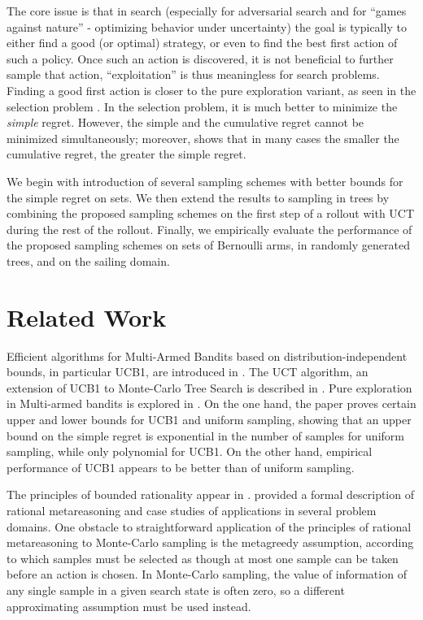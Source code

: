 \documentclass[letterpaper]{article}
\begin{document}
The core issue is that in search (especially for adversarial search
and for ``games against nature'' - optimizing behavior under
uncertainty) the goal is typically to either find a good (or optimal)
strategy, or even to find the best first action of such a policy. Once
such an action is discovered, it is not beneficial to further sample
that action, ``exploitation'' is thus meaningless for search
problems. Finding a good first action is closer to the pure
exploration variant, as seen in the selection problem
\cite{Bubeck.pure,TolpinShimony.blinkered}. In the selection problem,
it is much better to minimize the \emph{simple} regret.  However, the
simple and the cumulative regret cannot be minimized simultaneously;
moreover, \cite{Bubeck.pure} shows that in many cases the smaller the
cumulative regret, the greater the simple regret.

We begin with introduction of several sampling schemes with better
bounds for the simple regret on sets. We then extend the results to
sampling in trees by combining the proposed sampling schemes on the
first step of a rollout with UCT during the rest of the
rollout. Finally, we empirically evaluate the performance of the
proposed sampling schemes on sets of Bernoulli arms, in randomly
generated trees, and on the sailing domain.

\section{Related Work}
\label{sec:related-work}

Efficient algorithms for Multi-Armed Bandits based on
distribution-independent bounds, in particular UCB1, are introduced in
\cite{Auer.ucb}. The UCT algorithm, an extension of UCB1 to
Monte-Carlo Tree Search is described in \cite{Kocsis.uct}. Pure
exploration in Multi-armed bandits is explored in
\cite{Bubeck.pure}. On the one hand, the paper proves certain upper
and lower bounds for UCB1 and uniform sampling, showing that an upper
bound on the simple regret is exponential in the number of samples for
uniform sampling, while only polynomial for UCB1. On the other hand,
empirical performance of UCB1 appears to be better than of uniform
sampling. 

The principles of bounded rationality appear in
\cite{Horvitz.reasoningabout}. \cite{Russell.right} provided a formal
description of rational metareasoning and case studies of applications
in several problem domains. One obstacle to straightforward
application of the principles of rational metareasoning to Monte-Carlo
sampling is the metagreedy assumption, according to which samples must
be selected as though at most one sample can be taken before an action
is chosen. In Monte-Carlo sampling, the value of information of any
single sample in a given search state is often zero, so a different
approximating assumption must be used instead.
\end{document}

